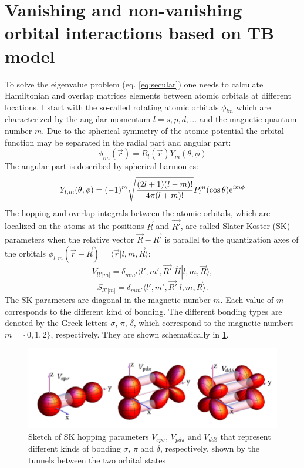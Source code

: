 \section{Vanishing and non-vanishing orbital interactions based on TB model}
To solve the eigenvalue problem (eq. \ref{eq:secular}) one needs to calculate Hamiltonian and overlap matrices elements between atomic orbitals at different locations. I start with the so-called rotating atomic orbitals $\phi_{lm}$ which are characterized by the angular momentum $l = {s, p, d, ...}$ and the magnetic quantum number $m$. Due to the spherical symmetry of the atomic potential the orbital function may be separated in the radial part and angular part:
\begin{equation}
	\phi_{lm}(\vec{r}) = R_l(\vec{r}) Y_m(\theta, \phi)
\end{equation}
The angular part is described by spherical harmonics:
\begin{equation}
	Y_{l,m}(\theta, \phi) = (-1)^m \sqrt{\frac{(2l + 1)(l-m)!}{4 \pi (l+m)!}} P_l^m(\cos{\theta})\mathrm{e}^{i m \phi}
\end{equation}
The hopping and overlap integrals between the atomic orbitals, which are localized on the atoms at the positions $\vec{R}$ and $\vec{R'}$, are called Slater-Koster (SK) parameters \cite{slatter} when the relative vector $\vec{R}-\vec{R'}$ is parallel to the quantization axes of the orbitals $\phi_{l,m}(\vec{r} - \vec{R}) = \langle \vec{r} | l, m, \vec{R} \rangle$: 
\begin{equation}
	V_{ll'|m|} = \delta_{mm'}\langle l', m', \vec{R'} | \hat{H} | l, m , \vec{R} \rangle, 
\end{equation}
\begin{equation}
	S_{ll'|m|} = \delta_{mm'}\langle l', m', \vec{R'} | l, m , \vec{R} \rangle.
\end{equation}
The SK parameters are diagonal in the magnetic number $m$. Each value of $m$ corresponds to the different kind of bonding. The different bonding types are denoted by the Greek letters $\sigma$, $\pi$, $\delta$, which correspond to the magnetic numbers $m = \{ 0, 1, 2 \}$, respectively. They are shown schematically in \ref{fig:orbitals}. 
\begin{figure}[hb]
  \includegraphics[width=\linewidth]{img/orbitals}
  \caption[caption]{Sketch of SK hopping parameters $V_{sp\sigma}$, $V_{pd\pi}$ and $V_{dd\delta}$ that represent different kinds of bonding $\sigma$, $\pi$ and $\delta$, respectively, shown by the tunnels between the two orbital states\footnotemark \label{fig:orbitals}}
\end{figure}


